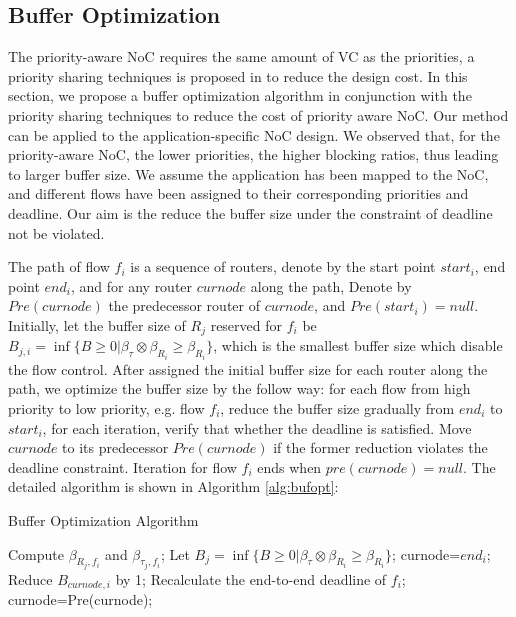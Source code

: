 \documentclass[10pt,journal]{IEEEtran}
\begin{document}
\subsection{Buffer Optimization}
The priority-aware NoC requires the same amount of VC as the priorities, a priority sharing techniques is proposed in \cite{5161497} to reduce the design cost. In this section, we propose a buffer optimization algorithm in conjunction with the priority sharing techniques to reduce the cost of priority aware NoC. Our method can be applied to the application-specific NoC design. We observed that, for the priority-aware NoC, the lower priorities, the higher blocking ratios, thus leading to larger buffer size. We assume the application has been mapped to the NoC, and different flows have been assigned to their corresponding priorities and deadline. Our aim is the reduce the buffer size under the constraint of deadline not be violated.

The path of flow $f_i$ is a sequence of routers, denote by the start point $start_i$, end point $end_i$, and for any router $curnode$ along the path, Denote by $Pre(curnode)$ the predecessor router of $curnode$, and $Pre(start_i)=null$. Initially, let the buffer size of $R_j$ reserved for $f_i$ be $B_{j,i}=\inf\{B\geq 0|\beta_{\tau}\otimes\beta_{R_i}\geq \beta_{R_i}\}$, which is the smallest buffer size which disable the flow control. After assigned the initial buffer size for each router along the path, we optimize the buffer size by the follow way: for each flow from high priority to low priority, e.g. flow $f_i$, reduce the buffer size gradually from $end_i$ to $start_i$, for each iteration, verify that whether the deadline is satisfied. Move $curnode$ to its predecessor $Pre(curnode)$ if the former reduction violates the deadline constraint. Iteration for flow $f_i$ ends when $pre(curnode)=null$. The detailed algorithm is shown in Algorithm \ref{alg:bufopt}:
\begin{algorithm}
\caption{Buffer Optimization Algorithm}
\label{alg:bufopt}
\begin{algorithmic}[1]
        \STATE Compute $\beta_{R_j,f_i}$ and $\beta_{\tau_j,f_i}$;
        \STATE Let $B_j=\inf\{B\geq 0|\beta_{\tau}\otimes\beta_{R_i}\geq \beta_{R_i}\}$;
    \ENDFOR
        \STATE curnode=$end_i$;
                \STATE Reduce $B_{curnode,i}$ by 1;
                \STATE Recalculate the end-to-end deadline of $f_i$;
            \ENDWHILE
            \STATE curnode=Pre(curnode);
        \ENDWHILE
    \ENDFOR
\end{algorithmic}
\end{algorithm}
\end{document}
